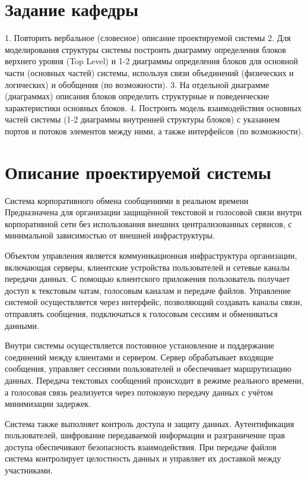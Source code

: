 \documentclass[14pt,a4paper]{extarticle}
\begin{document}
\section{Задание кафедры}
\begin{sloppypar}
    1. Повторить вербальное (словесное) описание проектируемой системы
    2. Для моделирования структуры системы построить диаграмму определения блоков верхнего уровня (Top Level) и 1-2 диаграммы определения блоков для основной части (основных частей) системы, используя связи объединений (физических и логических) и обобщения (по возможности).
    3. На отдельной диаграмме (диаграммах) описания блоков определить структурные и поведенческие характеристики основных блоков.
    4. Построить модель взаимодействия основных частей системы (1-2 диаграммы внутренней структуры блоков) с указанием портов и потоков элементов между ними, а также интерфейсов (по возможности).
\end{sloppypar}

\section{Описание проектируемой системы}

Система корпоративного обмена сообщениями в реальном времени
Предназначена для организации защищённой текстовой и голосовой связи внутри корпоративной сети без использования внешних централизованных сервисов, с минимальной зависимостью от внешней инфраструктуры.

Объектом управления является коммуникационная инфраструктура организации, включающая серверы, клиентские устройства пользователей и сетевые каналы передачи данных. С помощью клиентского приложения пользователь получает доступ к текстовым чатам, голосовым каналам и передаче файлов. Управление системой осуществляется через интерфейс, позволяющий создавать каналы связи, отправлять сообщения, подключаться к голосовым сессиям и обмениваться данными.

Внутри системы осуществляется постоянное установление и поддержание соединений между клиентами и сервером. Сервер обрабатывает входящие сообщения, управляет сессиями пользователей и обеспечивает маршрутизацию данных. Передача текстовых сообщений происходит в режиме реального времени, а голосовая связь реализуется через потоковую передачу данных с учётом минимизации задержек.

Система также выполняет контроль доступа и защиту данных. Аутентификация пользователей, шифрование передаваемой информации и разграничение прав доступа обеспечивают безопасность взаимодействия. При передаче файлов система контролирует целостность данных и управляет их доставкой между участниками.
\end{document}
